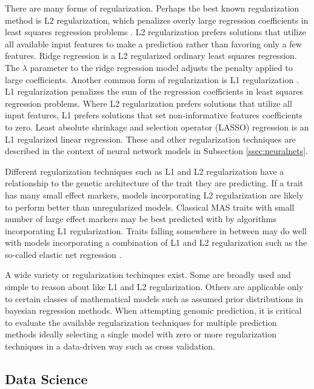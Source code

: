 There are many forms of regularization. Perhaps the best known regularization
method is L2 regularization, which penalizes overly large regression coefficients in least 
squares regression problems \citep{tibshirani1996}. L2 regularization prefers solutions that utilize all available 
input features to make a prediction rather than favoring only a few features. Ridge regression
is a L2 regularized ordinary least squares regression. The $\lambda$ parameter to
the ridge regression model adjusts the penalty applied to large coefficients. Another common
form of regularization is L1 regularization \citep{tibshirani1996}. L1 regularization penalizes the sum of the regression
coefficients in least squares regression problems. Where L2 regularization prefers solutions that
utilize all input features, L1 prefers solutions that set non-informative features coefficients
to zero. Least absolute shrinkage and selection operator (LASSO) regression is an L1 regularized
linear regression. These and other regularization techniques are described in the context
of neural network models in Subsection \ref{ssec:neuralnets}.

Different regularization techniques such as L1 and L2 regularization have a relationship
to the genetic architecture of the trait they are predicting. If a trait has many small 
effect markers, models incorporating L2 regularization are likely to perform better
than unregularized models. Classical MAS traits with small number of large effect
markers may be best predicted with by algorithms incorporating L1 regularization. 
Traits falling somewhere in between may do well with models incorporating a combination
of L1 and L2 regularization such as the so-called elastic net regression \citep{zou2005}.

A wide variety or regularization techinques exist. Some are broadly used and simple
to reason about like L1 and L2 regularization. Others are applicable only to certain 
classes of mathematical models such as assumed prior distributions in bayesian
regression methods. When attempting genomic prediction, it is critical to evaluate 
the available regularization techniques for multiple prediction methods ideally selecting 
a single model with zero or more regularization techniques in a data-driven way such 
as cross validation. 

\subsection{Data Science}

